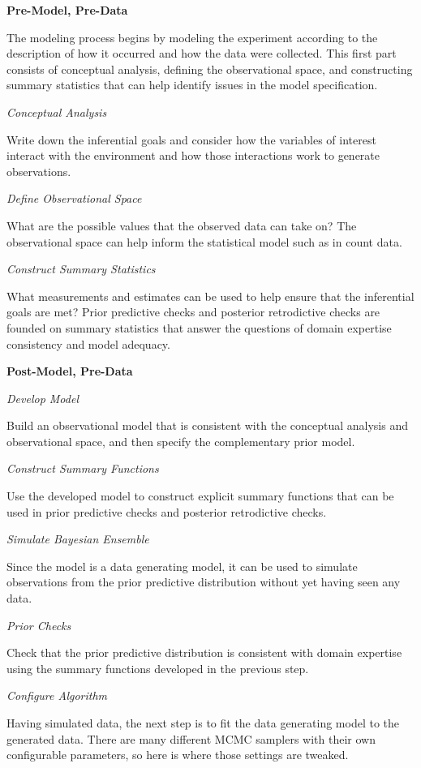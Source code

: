 \documentclass[11pt, oneside, openany]{scrbook}
\begin{document}
\textbf{Pre-Model, Pre-Data}

The modeling process begins by modeling the experiment according to the description of how it occurred and how the data were collected. This first part consists of conceptual analysis, defining the observational space, and constructing summary statistics that can help identify issues in the model specification.

\emph{Conceptual Analysis}

Write down the inferential goals and consider how the variables of interest interact with the environment and how those interactions work to generate observations.

\emph{Define Observational Space}

What are the possible values that the observed data can take on? The observational space can help inform the statistical model such as in count data.

\emph{Construct Summary Statistics}

What measurements and estimates can be used to help ensure that the inferential goals are met? Prior predictive checks and posterior retrodictive checks are founded on summary statistics that answer the questions of domain expertise consistency and model adequacy.

\textbf{Post-Model, Pre-Data}

\emph{Develop Model}

Build an observational model that is consistent with the conceptual analysis and observational space, and then specify the complementary prior model.

\emph{Construct Summary Functions}

Use the developed model to construct explicit summary functions that can be used in prior predictive checks and posterior retrodictive checks.

\emph{Simulate Bayesian Ensemble}

Since the model is a data generating model, it can be used to simulate observations from the prior predictive distribution without yet having seen any data.

\emph{Prior Checks}

Check that the prior predictive distribution is consistent with domain expertise using the summary functions developed in the previous step.

\emph{Configure Algorithm}

Having simulated data, the next step is to fit the data generating model to the generated data. There are many different MCMC samplers with their own configurable parameters, so here is where those settings are tweaked.
\end{document}
